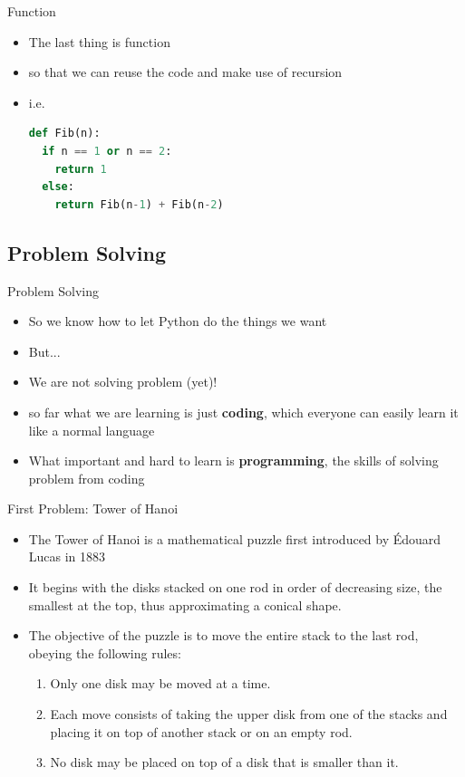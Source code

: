 \documentclass[10pt,xcolor={table,dvipsnames},t]{beamer}
\begin{document}
\begin{frame}[fragile]{Function}
  \begin{itemize}
    \item The last thing is function
    \item so that we can reuse the code and make use of recursion
    \item i.e.
\begin{lstlisting}[language=python]
  def Fib(n):
  if n == 1 or n == 2:
    return 1
  else:
    return Fib(n-1) + Fib(n-2)
\end{lstlisting}
  \end{itemize}
\end{frame}

\subsection{Problem Solving}
\begin{frame}[fragile]{Problem Solving}
  \begin{itemize}
    \item So we know how to let Python do the things we want
    \item But...
    \item We are not solving problem (yet)!
    \item so far what we are learning is just \textbf{coding}, which everyone can easily learn it like a normal language
    \item What important and hard to learn is \textbf{programming}, the skills of solving problem from coding
  \end{itemize}
\end{frame}

\begin{frame}{First Problem: Tower of Hanoi}
  \begin{itemize}
    \item The Tower of Hanoi is a mathematical puzzle first introduced by Édouard Lucas in 1883
    \item It begins with the disks stacked on one rod in order of decreasing size, the smallest at the top, thus approximating a conical shape. 
     \item The objective of the puzzle is to move the entire stack to the last rod, obeying the following rules: 
    \begin{enumerate}
      \item Only one disk may be moved at a time.
      \item Each move consists of taking the upper disk from one of the stacks and placing it on top of another stack or on an empty rod.
      \item No disk may be placed on top of a disk that is smaller than it.
    \end{enumerate}
  \end{itemize}
\end{frame}
\end{document}
